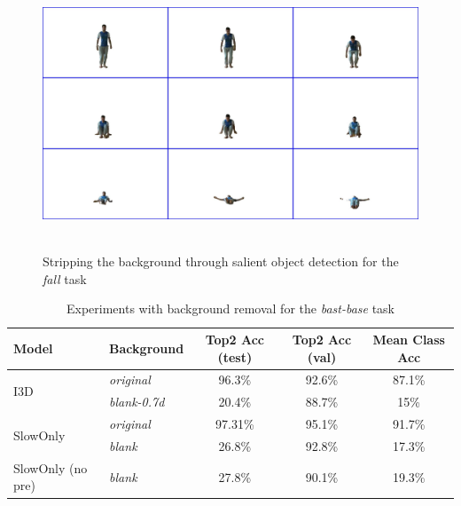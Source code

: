 \documentclass[extern,palatino]{cgMA}
\begin{document}
\begin{figure}[h]
\center
\includegraphics[height={230pt}, width={370pt}]{Thesis/images/fall_no_background.jpg}
\caption{Stripping the background through salient object detection for the \textit{fall} task}
\label{fig:fall_no_background}
\end{figure}

\begin{table}[h!]
  \begin{center}
    \caption{Experiments with background removal for the \textit{bast-base} task}
    \label{tab:research_question_5_no_background}
    \begin{tabular}{l|l|c|c|c}
      \textbf{Model} & \textbf{Background} & \textbf{Top2 Acc (test)} & \textbf{Top2 Acc (val)} & \textbf{Mean Class Acc}\\
      \hline
      \multirow{2}{*}{I3D} & \textit{original}& 96.3\% & 92.6\% & 87.1\%\\
      & \textit{blank-0.7d} & 20.4\% & 88.7\% & 15\%\\
      \hline
      \multirow{2}{*}{SlowOnly} & \textit{original}& 97.31\% & 95.1\% & 91.7\%\\
      & \textit{blank} & 26.8\% & 92.8\% & 17.3\%\\
      \hline
      \multirow{1}{*}{SlowOnly (no pre)} & \textit{blank} & 27.8\% & 90.1\% & 19.3\%\\
    \end{tabular}
  \end{center}
\end{table}
\end{document}
